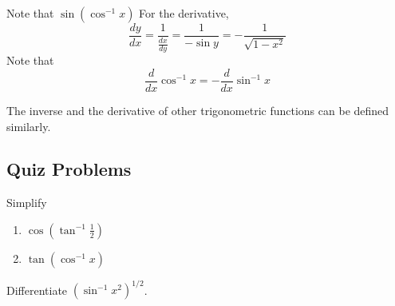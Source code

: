 \documentclass[../calc1-main.tex]{subfiles}
\begin{document}
Note that $\sin(\cos^{-1} x) $
For the derivative,
\[
  \frac{dy}{dx} = \frac{1}{\frac{dx}{dy}} = \frac{1}{-\sin y} = -\frac{1}{\sqrt{1-x^2}}
\]
Note that
\[
  \frac{d}{dx} \cos^{-1}x = -\frac{d}{dx} \sin^{-1}x
\]

The inverse and the derivative of other trigonometric functions can be defined similarly.

\subsection*{Quiz Problems}
\begin{example}
  Simplify
  \begin{enumerate}
    \item $\cos(\tan^{-1} \frac{1}{2})$
    \item $\tan (\cos^{-1} x)$
  \end{enumerate}
\end{example}
\begin{example}
  Differentiate $(\sin^{-1} x^2)^{1/2}$.
\end{example}
\end{document}
